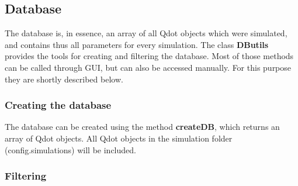 \subsection{Database}

The database is, in essence, an array of all Qdot objects which were simulated, and contains thus all parameters for every simulation. The class \textbf{DButils} provides the tools for creating and filtering the database. Most of those methods can be called through GUI, but can also be accessed manually. For this purpose they are shortly described below.

\subsubsection{Creating the database}
The database can be created using the method \textbf{createDB}, which returns an array of Qdot objects. All Qdot objects in the simulation folder (config.simulations) will be included.

\subsubsection{Filtering}

